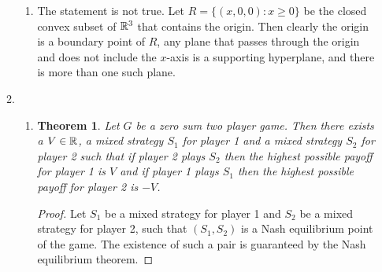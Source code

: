 \documentclass[11pt]{article} \usepackage{amssymb}
\newtheorem*{theorem*}{Theorem}
\begin{document}
\begin{enumerate}
\begin{enumerate}
\begin{enumerate}
    \item The statement is not true. Let $R=\{(x,0,0) : x \geq 0\}$ be
      the closed convex subset of $\mathbb R^3$ that contains the
      origin. Then clearly the origin is a boundary point of $R$, any
      plane that passes through the origin and does not include the
      $x$-axis is a supporting hyperplane, and there is more than one
      such plane.
    \end{enumerate}
  \item
    \begin{enumerate}
    \item
      \begin{theorem*}
        Let $G$ be a zero sum two player game. Then there exists a $V
        \in \mathbb R$, a mixed strategy $S_1$ for player 1 and a mixed
        strategy $S_2$ for player 2 such that if player 2 plays $S_2$
        then the highest possible payoff for player 1 is $V$ and if
        player 1 plays $S_1$ then the highest possible payoff for
        player 2 is $-V$.
      \end{theorem*}
      \begin{proof}        
        Let $S_1$ be a mixed strategy for player 1 and $S_2$ be a
        mixed strategy for player 2, such that $(S_1,S_2)$ is a Nash
        equilibrium point of the game. The existence of such a pair is
        guaranteed by the Nash equilibrium theorem.


\end{proof}
\end{enumerate}
\end{enumerate}
\end{enumerate}
\end{document}
